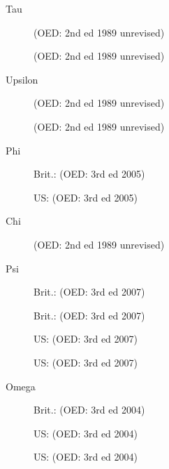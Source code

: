 \begin{description}
    \item[Tau]  (OED: 2nd ed 1989 unrevised)

                 (OED: 2nd ed 1989 unrevised)

    \item[Upsilon]  (OED: 2nd ed 1989 unrevised)

                     (OED: 2nd ed 1989 unrevised)

    \item[Phi] Brit.:  (OED: 3rd ed 2005)

                US:  (OED: 3rd ed 2005)

    \item[Chi]  (OED: 2nd ed 1989 unrevised)

    \item[Psi] Brit.:  (OED: 3rd ed 2007)

               Brit.:  (OED: 3rd ed 2007)

               US:  (OED: 3rd ed 2007)

               US:  (OED: 3rd ed 2007)

    \item[Omega] Brit.:  (OED: 3rd ed 2004)

                 US:  (OED: 3rd ed 2004)

                 US:  (OED: 3rd ed 2004)

\end{description}
